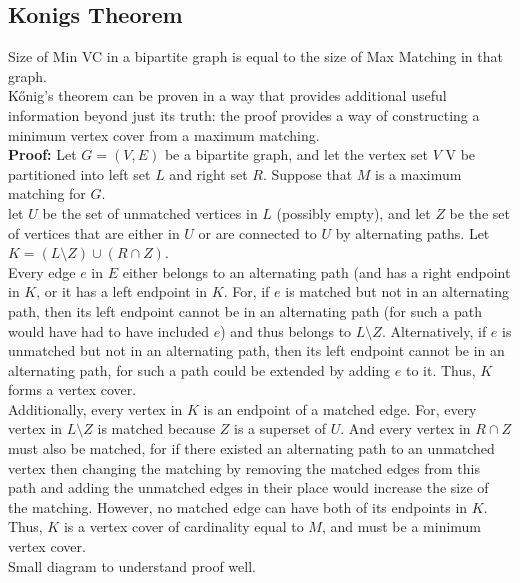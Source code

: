 \documentclass[8pt, a4paper, oneside, twocolumn]{extarticle}
\begin{document}
\subsection{Konigs Theorem}
Size of Min VC in a bipartite graph is equal to the size of Max Matching in that graph.
\\Kőnig's theorem can be proven in a way that provides additional useful information beyond just its truth: the proof provides a way of constructing a minimum vertex cover from a maximum matching.
\\\textbf{Proof: } Let $G = (V, E)$ be a bipartite graph, and let the vertex set $V$ V be partitioned into left set $L$ and right set $R$. Suppose that $M$ is a maximum matching for $G$.
\\let $U$ be the set of unmatched vertices in $L$ (possibly empty), and let $Z$ be the set of vertices that are either in $U$ or are connected to $U$ by alternating paths. Let $K = ( L \setminus Z ) \cup ( R \cap Z )$. 
\\Every edge $e$ in $E$ either belongs to an alternating path (and has a right endpoint in $K$, or it has a left endpoint in $K$. For, if $e$ is matched but not in an alternating path, then its left endpoint cannot be in an alternating path (for such a path would have had to have included $e$) and thus belongs to $L \setminus Z$. Alternatively, if $e$ is unmatched but not in an alternating path, then its left endpoint cannot be in an alternating path, for such a path could be extended by adding $e$ to it. Thus, $K$ forms a vertex cover.\\
Additionally, every vertex in $K$ is an endpoint of a matched edge. For, every vertex in $L \setminus Z$ is matched because $Z$ is a superset of $U$. And every vertex in $R \cap Z$ must also be matched, for if there existed an alternating path to an unmatched vertex then changing the matching by removing the matched edges from this path and adding the unmatched edges in their place would increase the size of the matching. However, no matched edge can have both of its endpoints in $K$. Thus, $K$ is a vertex cover of cardinality equal to $M$, and must be a minimum vertex cover.
\\Small diagram to understand proof well.
\end{document}
